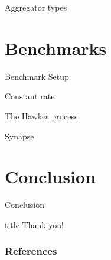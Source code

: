\documentclass[
  ignorenonframetext,
  aspectratio=169
]{beamer}
\begin{document}
\begin{frame}{Aggregator types}
\end{frame}

\hypertarget{benchmarks}{%
\section{Benchmarks}\label{benchmarks}}

\begin{frame}{Benchmark Setup}
\end{frame}

\begin{frame}{Constant rate}
\end{frame}

\begin{frame}{The Hawkes process}
\end{frame}

\begin{frame}{Synapse}
\end{frame}

\hypertarget{conclusion}{%
\section{Conclusion}\label{conclusion}}

\begin{frame}{Conclusion}
\end{frame}

\begin{frame}
  \thispagestyle{empty@titlepage}
  \begingroup
    \begin{beamercolorbox}[sep=8pt,center]{title}%
      {Thank you!}%
    \end{beamercolorbox}
  \endgroup
\end{frame}

\begin{frame}[t,allowframebreaks]
  \frametitle{References}
  \printbibliography[heading=none]
\end{frame}
\end{document}
